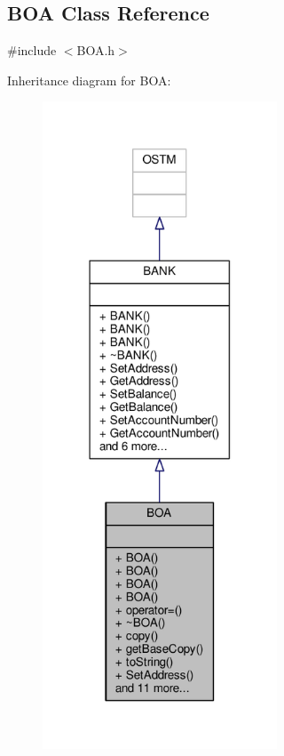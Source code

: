 \hypertarget{class_b_o_a}{}\subsection{B\+OA Class Reference}
\label{class_b_o_a}


{\ttfamily \#include $<$B\+O\+A.\+h$>$}



Inheritance diagram for B\+OA\+:
\nopagebreak
\begin{figure}[H]
\begin{center}
\leavevmode
\includegraphics[width=198pt]{class_b_o_a__inherit__graph}
\end{center}
\end{figure}


